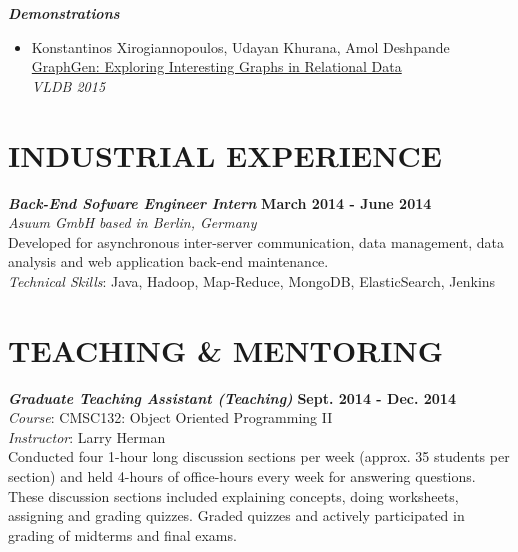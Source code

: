 \documentclass[margin, 10pt]{res} %
\begin{document}
\begin{resume}
{\sl \textbf{Demonstrations} }\\
\begin{itemize}
  \item Konstantinos Xirogiannopoulos, Udayan Khurana, Amol Deshpande\\
  \href{http://www.vldb.org/pvldb/vol8/p2032-xirogiannopoulos.pdf}{GraphGen: Exploring Interesting Graphs in Relational Data}\\
  \textit{VLDB 2015}
\end{itemize}


\section{INDUSTRIAL EXPERIENCE}

{\sl \textbf{Back-End Sofware Engineer Intern} } \hfill \textbf{March 2014 - June 2014}\\
\textit{Asuum GmbH based in Berlin, Germany}\\
Developed for asynchronous inter-server communication, data management, data analysis and web application back-end maintenance.\\
\textit{Technical Skills}: Java, Hadoop, Map-Reduce, MongoDB, ElasticSearch, Jenkins


\section{TEACHING \& MENTORING}

{\sl \textbf{Graduate Teaching Assistant (Teaching)}} \hfill \textbf{Sept. 2014 - Dec. 2014}\\
\textit{Course}: CMSC132: Object Oriented Programming II \\
\textit{Instructor}: Larry Herman\\
Conducted four 1-hour long discussion sections per week (approx. 35 students per section) and held 4-hours of office-hours every week for answering questions. These discussion sections included explaining concepts, doing worksheets, assigning and grading quizzes. Graded quizzes and actively participated in grading of midterms and final exams.




\end{resume}
\end{document}
